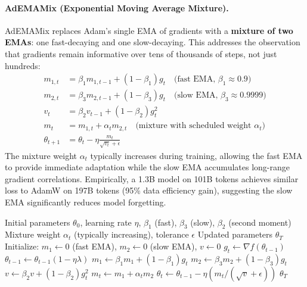 \documentclass[11pt,a4paper]{article}
\begin{document}
\paragraph{AdEMAMix (Exponential Moving Average Mixture).}
AdEMAMix replaces Adam's single EMA of gradients with a \textbf{mixture of two EMAs}: one fast-decaying and one slow-decaying. This addresses the observation that gradients remain informative over tens of thousands of steps, not just hundreds:
\begin{align}
m_{1,t} &= \beta_1 m_{1,t-1} + (1-\beta_1)g_t \quad\text{(fast EMA, $\beta_1 \approx 0.9$)} \\
m_{2,t} &= \beta_3 m_{2,t-1} + (1-\beta_3)g_t \quad\text{(slow EMA, $\beta_3 \approx 0.9999$)} \\
v_t &= \beta_2 v_{t-1} + (1-\beta_2)g_t^2 \\
m_t &= m_{1,t} + \alpha_t m_{2,t} \quad\text{(mixture with scheduled weight $\alpha_t$)} \\
\theta_{t+1} &= \theta_t - \eta\frac{m_t}{\sqrt{v_t}+\epsilon}
\end{align}
The mixture weight $\alpha_t$ typically increases during training, allowing the fast EMA to provide immediate adaptation while the slow EMA accumulates long-range gradient correlations. Empirically, a 1.3B model on 101B tokens achieves similar loss to AdamW on 197B tokens (95\% data efficiency gain), suggesting the slow EMA significantly reduces model forgetting.

\begin{algorithm}[H]
\caption{AdEMAMix (Exponential Moving Average Mixture)}
\label{alg:ademamix}
\begin{algorithmic}[1]
\Require Initial parameters $\theta_0$, learning rate $\eta$, $\beta_1$ (fast), $\beta_3$ (slow), $\beta_2$ (second moment)
\Require Mixture weight $\alpha_t$ (typically increasing), tolerance $\epsilon$
\Ensure Updated parameters $\theta_T$
\State Initialize: $m_1 \gets 0$ (fast EMA), $m_2 \gets 0$ (slow EMA), $v \gets 0$
    \State $g_t \gets \nabla f(\theta_{t-1})$
        \State $\theta_{t-1} \gets \theta_{t-1}(1 - \eta\lambda)$
    \EndIf
    \State $m_1 \gets \beta_1 m_1 + (1-\beta_1) g_t$ 
    \State $m_2 \gets \beta_3 m_2 + (1-\beta_3) g_t$ 
    \State $v \gets \beta_2 v + (1-\beta_2) g_t^2$
    \State $m_t \gets m_1 + \alpha_t m_2$ 
    \State $\theta_t \gets \theta_{t-1} - \eta (m_t / (\sqrt{v} + \epsilon))$
\EndFor
\Return $\theta_T$
\end{algorithmic}
\end{algorithm}
\end{document}
